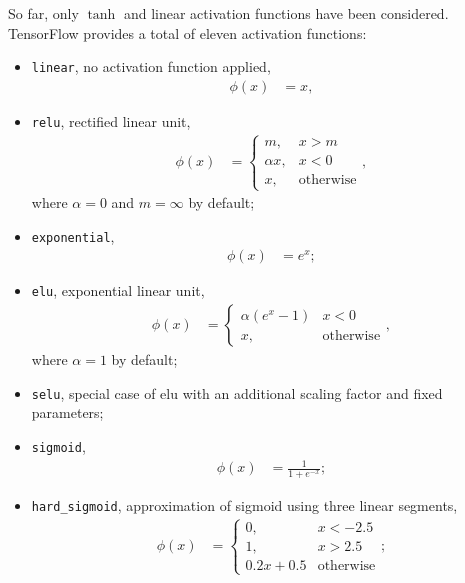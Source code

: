 So far, only $\tanh$ and linear activation functions have been considered.
TensorFlow provides a total of eleven activation functions:
\begin{itemize}
    \item\texttt{linear}, no activation function applied,
        \begin{align*}
            \phi(x) &= x,
        \end{align*}

    \item\texttt{relu}, rectified linear unit,
        \begin{align*}
            \phi(x) &= \begin{cases}
                m, & x > m\\
                \alpha x, & x < 0\\
                x, & \text{otherwise}
            \end{cases},
        \end{align*}
        where $\alpha = 0$ and $m = \infty$ by default;

    \item\texttt{exponential},
        \begin{align*}
            \phi(x) &= e^x;
        \end{align*}

    \item\texttt{elu}, exponential linear unit,
        \begin{align*}
            \phi(x) &= \begin{cases}
                \alpha (e^x - 1) & x < 0\\
                x, & \text{otherwise}
            \end{cases},
        \end{align*}
        where $\alpha = 1$ by default;

    \item\texttt{selu}, special case of elu with an additional scaling factor
        and fixed parameters;

    \item\texttt{sigmoid},
        \begin{align*}
            \phi(x) &= \frac{1}{1 + e^{-x}};
        \end{align*}

    \item\texttt{hard\_sigmoid}, approximation of sigmoid using three linear
        segments,
        \begin{align*}
            \phi(x) &= \begin{cases}
                0, & x < -2.5\\
                1, & x > 2.5\\
                0.2x+0.5 & \text{otherwise}
            \end{cases};
        \end{align*}


\end{itemize}
